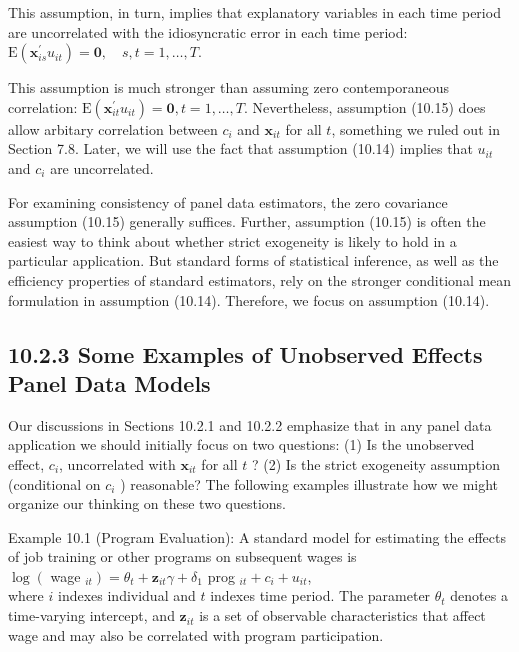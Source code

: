 \documentclass[10pt]{article}
\begin{document}
This assumption, in turn, implies that explanatory variables in each time period are uncorrelated with the idiosyncratic error in each time period:\\
$\mathrm{E}\left(\mathbf{x}_{i s}^{\prime} u_{i t}\right)=\mathbf{0}, \quad s, t=1, \ldots, T$.

This assumption is much stronger than assuming zero contemporaneous correlation: $\mathrm{E}\left(\mathbf{x}_{i t}^{\prime} u_{i t}\right)=\mathbf{0}, t=1, \ldots, T$. Nevertheless, assumption (10.15) does allow arbitary correlation between $c_{i}$ and $\mathbf{x}_{i t}$ for all $t$, something we ruled out in Section 7.8. Later, we will use the fact that assumption (10.14) implies that $u_{i t}$ and $c_{i}$ are uncorrelated.

For examining consistency of panel data estimators, the zero covariance assumption (10.15) generally suffices. Further, assumption (10.15) is often the easiest way to think about whether strict exogeneity is likely to hold in a particular application. But standard forms of statistical inference, as well as the efficiency properties of standard estimators, rely on the stronger conditional mean formulation in assumption (10.14). Therefore, we focus on assumption (10.14).

\subsection*{10.2.3 Some Examples of Unobserved Effects Panel Data Models}
Our discussions in Sections 10.2.1 and 10.2.2 emphasize that in any panel data application we should initially focus on two questions: (1) Is the unobserved effect, $c_{i}$, uncorrelated with $\mathbf{x}_{i t}$ for all $t$ ? (2) Is the strict exogeneity assumption (conditional on $c_{i}$ ) reasonable? The following examples illustrate how we might organize our thinking on these two questions.

Example 10.1 (Program Evaluation): A standard model for estimating the effects of job training or other programs on subsequent wages is\\
$\log \left(\right.$ wage $\left._{i t}\right)=\theta_{t}+\mathbf{z}_{i t} \gamma+\delta_{1}$ prog $_{i t}+c_{i}+u_{i t}$,\\
where $i$ indexes individual and $t$ indexes time period. The parameter $\theta_{t}$ denotes a time-varying intercept, and $\mathbf{z}_{i t}$ is a set of observable characteristics that affect wage and may also be correlated with program participation.
\end{document}

